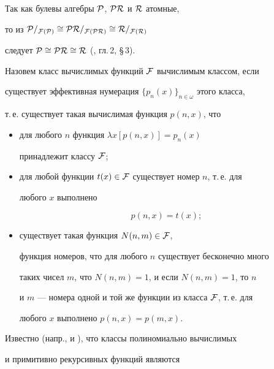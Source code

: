 Так как булевы алгебры $\cal{P}$, $\cal{PR}$ и $\cal{R}$ атомные,


то из $\cal{P}/_{\cal{F}(\cal{P})}\cong\cal{PR}/_{


\cal{F}(\cal{PR})}\cong\cal{R}/_{\cal{F}(\cal{R})}$


следует $\cal{P}\cong\cal{PR}\cong\cal{R}$ (\cite{ershov}, гл.\,2, \S\,3).





\begin{defn}\label{numbering}


Назовем класс вычислимых функций $\cal{F}$ вычислимым классом, если


существует эффективная нумерация $\{p_n(x)\}_{n\in\omega}$ этого класса,


т.\,е. существует такая вычислимая функция $p(n,x)$, что


\begin{itemize}


\item[1)] для любого $n$ функция $\lambda x[p(n,x)]=p_n(x)$


принадлежит классу $\cal{F}$;


\item[2)] для любой функции $t(x)\in\cal{F}$ существует номер $n$, т.\,е. для


любого $x$ выполнено


$$


p(n,x)=t(x);


$$


\item[3)] существует такая функция $N(n, m)\in\cal{F}$,


функция номеров, что для любого $n$ существует бесконечно много


таких чисел $m$, что $N(n, m)=1$, и если $N(n, m)=1$, то $n$


и $m$ --- номера одной и той же функции из класса $\cal{F}$, т.\,е. для


любого $x$ выполнено $p(n, x)=p(m, x)$.


\end{itemize}


\end{defn}





Известно (напр., \cite{A-S} и \cite{Mal}), что классы полиномиально вычислимых


и примитивно рекурсивных функций являются 



